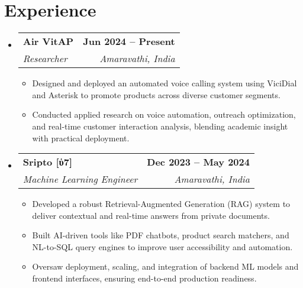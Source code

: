 \documentclass[letterpaper,11pt]{article}
\makeatletter
\newcommand{\resumeItem}[1]{
  \item\small{
    {#1 \vspace{-2pt}}
  }
}
\newcommand{\resumeSubheading}[4]{
  \vspace{-2pt}\item
    \begin{tabular*}{1.0\textwidth}[t]{l@{\extracolsep{\fill}}r}
      \textbf{#1} & \textbf{\small #2} \\
      \textit{\small#3} & \textit{\small #4} \\
    \end{tabular*}\vspace{-7pt}
}
\newcommand{\resumeSubHeadingListStart}{\begin{itemize}[leftmargin=0.0in, label={}]}
\newcommand{\resumeSubHeadingListEnd}{\end{itemize}}
\newcommand{\resumeItemListStart}{\begin{itemize}}
\newcommand{\resumeItemListEnd}{\end{itemize}\vspace{-5pt}}
\makeatother
\begin{document}
\section{Experience}
  \resumeSubHeadingListStart

    \resumeSubheading
      {Air VitAP}{Jun 2024 -- Present}
      {Researcher}{Amaravathi, India}
      \resumeItemListStart
        \resumeItem{Designed and deployed an automated voice calling system using ViciDial and Asterisk to promote products across diverse customer segments.}
        \resumeItem{Conducted applied research on voice automation, outreach optimization, and real-time customer interaction analysis, blending academic insight with practical deployment.}
      \resumeItemListEnd

    \resumeSubheading
      {Sripto [ὑ7]}{Dec 2023 -- May 2024}
      {Machine Learning Engineer}{Amaravathi, India}
      \resumeItemListStart
        \resumeItem{Developed a robust Retrieval-Augmented Generation (RAG) system to deliver contextual and real-time answers from private documents.}
        \resumeItem{Built AI-driven tools like PDF chatbots, product search matchers, and NL-to-SQL query engines to improve user accessibility and automation.}
        \resumeItem{Oversaw deployment, scaling, and integration of backend ML models and frontend interfaces, ensuring end-to-end production readiness.}
      \resumeItemListEnd

  \resumeSubHeadingListEnd
\vspace{-16pt}



\end{document}
